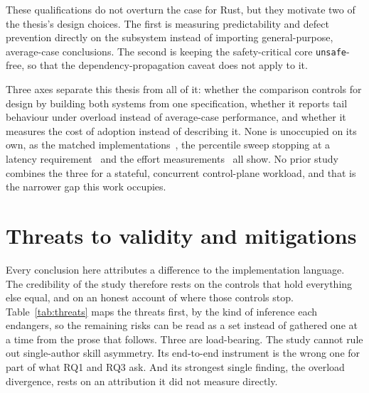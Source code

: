 \documentclass[english,oneside,a4paper,censored,csm,software-track-2020]{HYthesisML}
\begin{document}
These qualifications do not overturn the case for Rust, but they motivate two of the thesis's
design choices. The first is measuring predictability and defect prevention directly on the
subsystem instead of importing general-purpose, average-case conclusions. The second is keeping
the safety-critical core \texttt{unsafe}-free, so that the dependency-propagation caveat does not
apply to it.

Three axes separate this thesis from all of it: whether the comparison controls for design by
building both systems from one specification, whether it reports tail behaviour under overload
instead of average-case performance, and whether it measures the cost of adoption instead of
describing it. None is unoccupied on its own, as the matched
implementations~\cite{emmerich2019drivers,li2021ipc,narayanan2020redleaf,suchert2023stamp,gonzalez2023rustudp,pirelli2023safelowlevel,emberg2023asn1},
the percentile sweep stopping at a latency requirement~\cite{arvidsson2025async} and the effort
measurements~\cite{karlback2021ran,fulton2021adopting} all show. No prior study combines the
three for a stateful, concurrent control-plane workload, and that is the narrower gap this work
occupies.

\section{Threats to validity and mitigations}\label{sec:threats}
Every conclusion here attributes a difference to the implementation language. The
credibility of the study therefore rests on the controls that hold everything else equal, and on an
honest account of where those controls stop. Table~\ref{tab:threats} maps the threats first, by the
kind of inference each endangers, so the remaining risks can be read as a set instead of
gathered one at a time from the prose that follows. Three are load-bearing. The study cannot rule
out single-author skill asymmetry. Its end-to-end instrument is the wrong one for part of what RQ1
and RQ3 ask. And its strongest single finding, the overload divergence, rests on an attribution it
did not measure directly.
\end{document}
